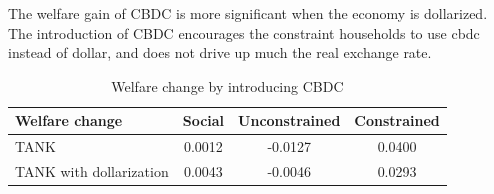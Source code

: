 \documentclass[12pt]{article}
\begin{document}
The welfare gain of CBDC is more significant when the economy is dollarized. The introduction of CBDC encourages the constraint households to use cbdc instead of dollar, and does not drive up much the real exchange rate. 

\begin{table}[h!]
\centering
\begin{tabular}{lccc}
\hline\hline
Welfare change & Social & Unconstrained & Constrained  \\ \hline
TANK &    0.0012 &  -0.0127   & 0.0400 \\
TANK with dollarization & 0.0043 &  -0.0046  &  0.0293\\\hline
\end{tabular}
\caption{Welfare change by introducing CBDC}
\label{Welfare2}
\end{table}
\end{document}
